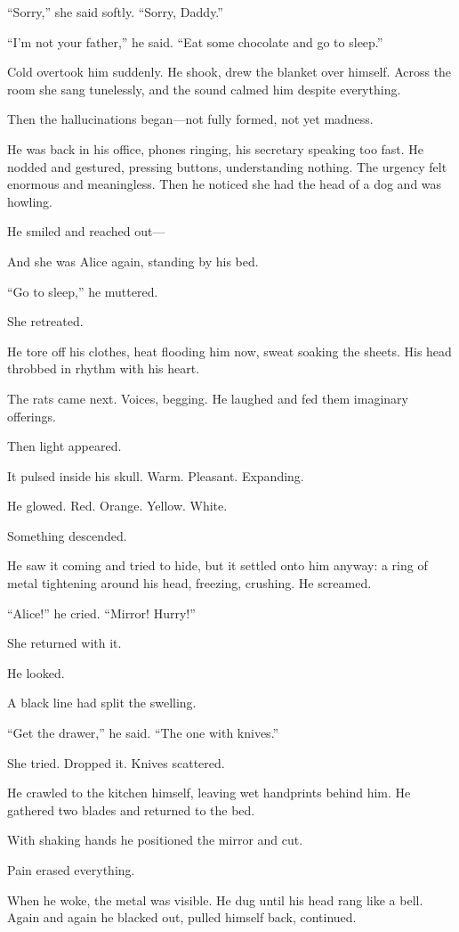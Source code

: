 “Sorry,” she said softly. “Sorry, Daddy.”

“I’m not your father,” he said. “Eat some chocolate and go to sleep.”

Cold overtook him suddenly. He shook, drew the blanket over himself. Across the room she sang tunelessly, and the sound calmed him despite everything.

Then the hallucinations began—not fully formed, not yet madness.

He was back in his office, phones ringing, his secretary speaking too fast. He nodded and gestured, pressing buttons, understanding nothing. The urgency felt enormous and meaningless. Then he noticed she had the head of a dog and was howling.

He smiled and reached out—

And she was Alice again, standing by his bed.

“Go to sleep,” he muttered.

She retreated.

He tore off his clothes, heat flooding him now, sweat soaking the sheets. His head throbbed in rhythm with his heart.

The rats came next. Voices, begging. He laughed and fed them imaginary offerings.

Then light appeared.

It pulsed inside his skull. Warm. Pleasant. Expanding.

He glowed. Red. Orange. Yellow. White.

Something descended.

He saw it coming and tried to hide, but it settled onto him anyway: a ring of metal tightening around his head, freezing, crushing. He screamed.

“Alice!” he cried. “Mirror! Hurry!”

She returned with it.

He looked.

A black line had split the swelling.

“Get the drawer,” he said. “The one with knives.”

She tried. Dropped it. Knives scattered.

He crawled to the kitchen himself, leaving wet handprints behind him. He gathered two blades and returned to the bed.

With shaking hands he positioned the mirror and cut.

Pain erased everything.

When he woke, the metal was visible. He dug until his head rang like a bell. Again and again he blacked out, pulled himself back, continued.

